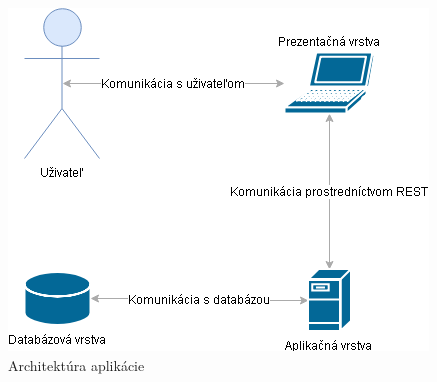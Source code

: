 \documentclass[zadani,slovak]{fitthesis}
\begin{document}
\begin{figure}[H]
    \centering
    \includegraphics[scale=0.65]{obrazky/architektura.png}
    \caption{Architektúra aplikácie}
    \label{fig:architektura}
\end{figure}
\end{document}
